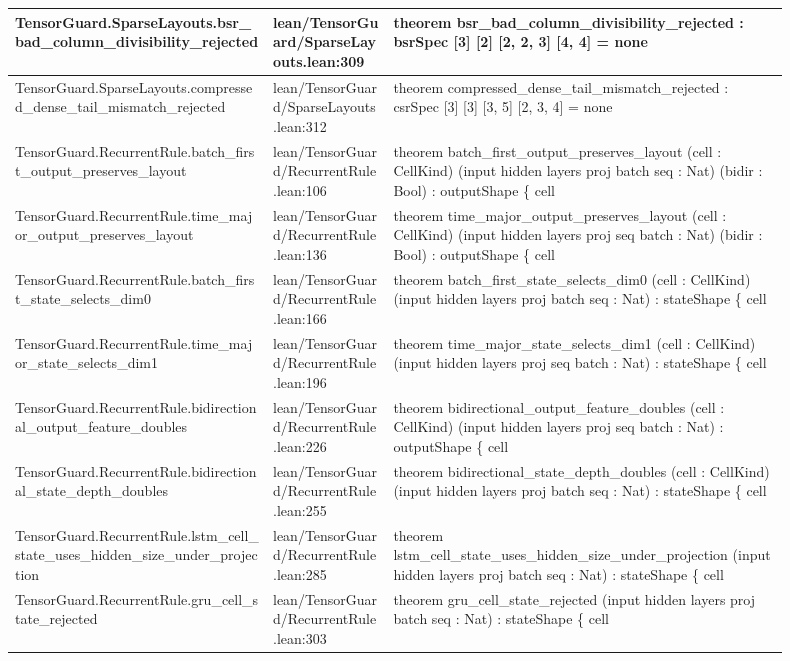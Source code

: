 \documentclass[10pt]{article}
\begin{document}
\begin{longtable}{|p{0.30\linewidth}|p{0.14\linewidth}|p{0.46\linewidth}|}
\hline
TensorGuard.SparseLayouts.bsr\_bad\_column\_divisibility\_rejected & lean/TensorGuard/SparseLayouts.lean:309 & theorem bsr\_bad\_column\_divisibility\_rejected : bsrSpec [3] [2] [2, 2, 3] [4, 4] = none \\
\hline
TensorGuard.SparseLayouts.compressed\_dense\_tail\_mismatch\_rejected & lean/TensorGuard/SparseLayouts.lean:312 & theorem compressed\_dense\_tail\_mismatch\_rejected : csrSpec [3] [3] [3, 5] [2, 3, 4] = none \\
\hline
TensorGuard.RecurrentRule.batch\_first\_output\_preserves\_layout & lean/TensorGuard/RecurrentRule.lean:106 & theorem batch\_first\_output\_preserves\_layout (cell : CellKind) (input hidden layers proj batch seq : Nat) (bidir : Bool) : outputShape \{ cell \\
\hline
TensorGuard.RecurrentRule.time\_major\_output\_preserves\_layout & lean/TensorGuard/RecurrentRule.lean:136 & theorem time\_major\_output\_preserves\_layout (cell : CellKind) (input hidden layers proj seq batch : Nat) (bidir : Bool) : outputShape \{ cell \\
\hline
TensorGuard.RecurrentRule.batch\_first\_state\_selects\_dim0 & lean/TensorGuard/RecurrentRule.lean:166 & theorem batch\_first\_state\_selects\_dim0 (cell : CellKind) (input hidden layers proj batch seq : Nat) : stateShape \{ cell \\
\hline
TensorGuard.RecurrentRule.time\_major\_state\_selects\_dim1 & lean/TensorGuard/RecurrentRule.lean:196 & theorem time\_major\_state\_selects\_dim1 (cell : CellKind) (input hidden layers proj seq batch : Nat) : stateShape \{ cell \\
\hline
TensorGuard.RecurrentRule.bidirectional\_output\_feature\_doubles & lean/TensorGuard/RecurrentRule.lean:226 & theorem bidirectional\_output\_feature\_doubles (cell : CellKind) (input hidden layers proj seq batch : Nat) : outputShape \{ cell \\
\hline
TensorGuard.RecurrentRule.bidirectional\_state\_depth\_doubles & lean/TensorGuard/RecurrentRule.lean:255 & theorem bidirectional\_state\_depth\_doubles (cell : CellKind) (input hidden layers proj batch seq : Nat) : stateShape \{ cell \\
\hline
TensorGuard.RecurrentRule.lstm\_cell\_state\_uses\_hidden\_size\_under\_projection & lean/TensorGuard/RecurrentRule.lean:285 & theorem lstm\_cell\_state\_uses\_hidden\_size\_under\_projection (input hidden layers proj batch seq : Nat) : stateShape \{ cell \\
\hline
TensorGuard.RecurrentRule.gru\_cell\_state\_rejected & lean/TensorGuard/RecurrentRule.lean:303 & theorem gru\_cell\_state\_rejected (input hidden layers proj batch seq : Nat) : stateShape \{ cell \\

\end{longtable}
\end{document}
